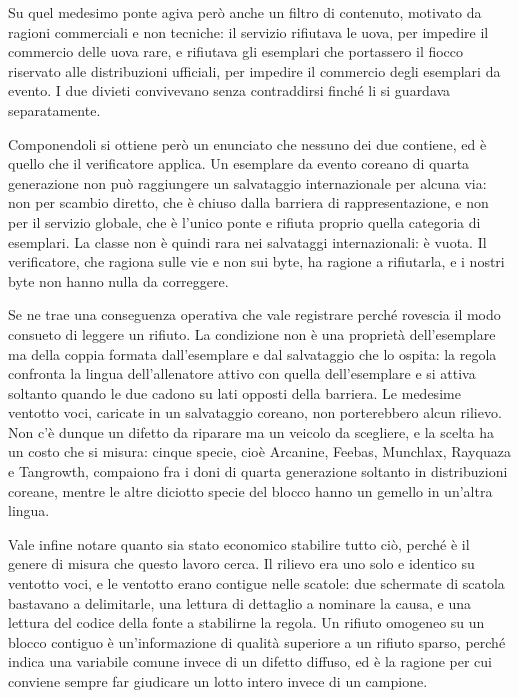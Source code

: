 Su quel medesimo ponte agiva però anche un filtro di contenuto, motivato da ragioni commerciali e non tecniche: il servizio rifiutava le uova, per impedire il commercio delle uova rare, e rifiutava gli esemplari che portassero il fiocco riservato alle distribuzioni ufficiali, per impedire il commercio degli esemplari da evento. I due divieti convivevano senza contraddirsi finché li si guardava separatamente.

Componendoli si ottiene però un enunciato che nessuno dei due contiene, ed è quello che il verificatore applica. Un esemplare da evento coreano di quarta generazione non può raggiungere un salvataggio internazionale per alcuna via: non per scambio diretto, che è chiuso dalla barriera di rappresentazione, e non per il servizio globale, che è l'unico ponte e rifiuta proprio quella categoria di esemplari. La classe non è quindi rara nei salvataggi internazionali: è vuota. Il verificatore, che ragiona sulle vie e non sui byte, ha ragione a rifiutarla, e i nostri byte non hanno nulla da correggere.

Se ne trae una conseguenza operativa che vale registrare perché rovescia il modo consueto di leggere un rifiuto. La condizione non è una proprietà dell'esemplare ma della coppia formata dall'esemplare e dal salvataggio che lo ospita: la regola confronta la lingua dell'allenatore attivo con quella dell'esemplare e si attiva soltanto quando le due cadono su lati opposti della barriera. Le medesime ventotto voci, caricate in un salvataggio coreano, non porterebbero alcun rilievo. Non c'è dunque un difetto da riparare ma un veicolo da scegliere, e la scelta ha un costo che si misura: cinque specie, cioè Arcanine, Feebas, Munchlax, Rayquaza e Tangrowth, compaiono fra i doni di quarta generazione soltanto in distribuzioni coreane, mentre le altre diciotto specie del blocco hanno un gemello in un'altra lingua.

Vale infine notare quanto sia stato economico stabilire tutto ciò, perché è il genere di misura che questo lavoro cerca. Il rilievo era uno solo e identico su ventotto voci, e le ventotto erano contigue nelle scatole: due schermate di scatola bastavano a delimitarle, una lettura di dettaglio a nominare la causa, e una lettura del codice della fonte a stabilirne la regola. Un rifiuto omogeneo su un blocco contiguo è un'informazione di qualità superiore a un rifiuto sparso, perché indica una variabile comune invece di un difetto diffuso, ed è la ragione per cui conviene sempre far giudicare un lotto intero invece di un campione.

